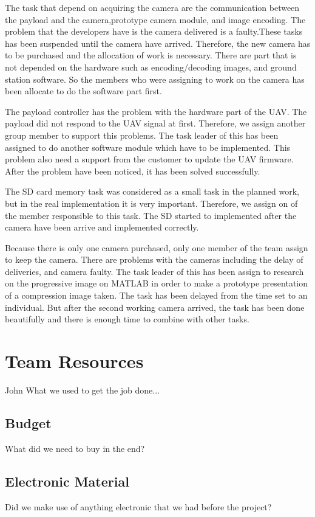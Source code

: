 The task that depend on acquiring the camera are the communication between the payload and the camera,prototype camera module, and image encoding. The problem that the developers have is the camera delivered is a faulty.These tasks has been suspended until the camera have arrived.  Therefore, the new camera has to be purchased and the allocation of work is necessary. There are part that is not depended on the hardware such as encoding/decoding images, and ground station software. So the members who were assigning to work on the camera has been allocate to do the software part first.

The payload controller has the problem with the hardware part of the UAV. The payload did not respond to the UAV signal at first. Therefore, we assign another group member to support this problems. The task leader of this has been assigned to do another software module which have to be implemented. This problem also need a support from the customer to update the UAV firmware. After the problem have been noticed, it has been solved successfully. 

The SD card memory task was considered as a small task in the planned work, but in the real implementation it is very important. Therefore, we assign on of the member responsible to this task. The SD started to implemented after the camera have been arrive and implemented correctly. 

Because there is only one camera purchased, only one member of the team assign to keep the camera. There are problems with the cameras including the delay of deliveries, and camera faulty. The task leader of this has been assign to research on the progressive image on MATLAB in order to make a prototype presentation of a compression image taken. The task has been delayed from the time set to an individual. But after the second working camera arrived, the task has been done beautifully and there is enough time to combine with other tasks.

\section{Team Resources}
John
What we used to get the job done...

\subsection{Budget}
What did we need to buy in the end?

\subsection{Electronic Material}
Did we make use of anything electronic that we had before the project?

